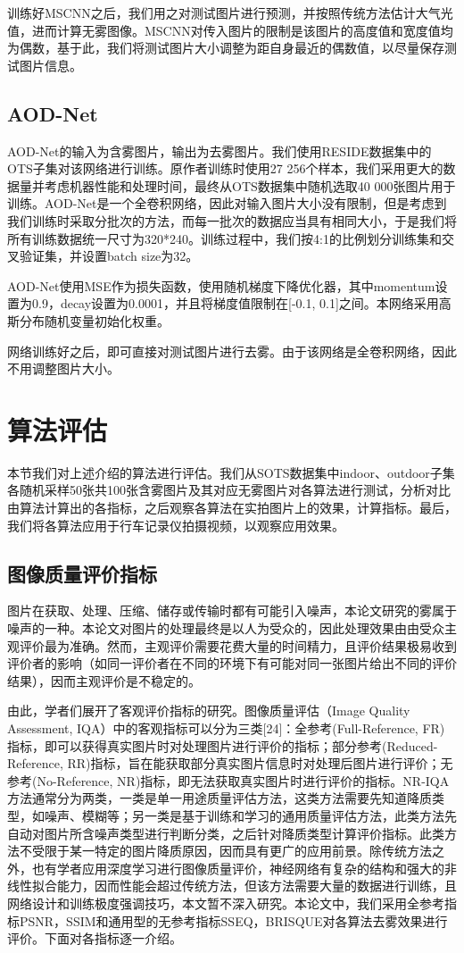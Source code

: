 \documentclass[a4paper, 12pt]{report}
\begin{document}
训练好MSCNN之后，我们用之对测试图片进行预测，并按照传统方法估计大气光值，进而计算无雾图像。MSCNN对传入图片的限制是该图片的高度值和宽度值均为偶数，基于此，我们将测试图片大小调整为距自身最近的偶数值，以尽量保存测试图片信息。

\subsection{AOD-Net\quad}
AOD-Net的输入为含雾图片，输出为去雾图片。我们使用RESIDE数据集中的OTS子集对该网络进行训练。原作者训练时使用27 256个样本，我们采用更大的数据量并考虑机器性能和处理时间，最终从OTS数据集中随机选取40 000张图片用于训练。AOD-Net是一个全卷积网络，因此对输入图片大小没有限制，但是考虑到我们训练时采取分批次的方法，而每一批次的数据应当具有相同大小，于是我们将所有训练数据统一尺寸为320*240。训练过程中，我们按4:1的比例划分训练集和交叉验证集，并设置batch size为32。
	
AOD-Net使用MSE作为损失函数，使用随机梯度下降优化器，其中momentum设置为0.9，decay设置为0.0001，并且将梯度值限制在[-0.1, 0.1]之间。本网络采用高斯分布随机变量初始化权重。
	
网络训练好之后，即可直接对测试图片进行去雾。由于该网络是全卷积网络，因此不用调整图片大小。

\section{算法评估\quad}
本节我们对上述介绍的算法进行评估。我们从SOTS数据集中indoor、outdoor子集各随机采样50张共100张含雾图片及其对应无雾图片对各算法进行测试，分析对比由算法计算出的各指标，之后观察各算法在实拍图片上的效果，计算指标。最后，我们将各算法应用于行车记录仪拍摄视频，以观察应用效果。

\subsection{图像质量评价指标\quad}
图片在获取、处理、压缩、储存或传输时都有可能引入噪声，本论文研究的雾属于噪声的一种。本论文对图片的处理最终是以人为受众的，因此处理效果由由受众主观评价最为准确。然而，主观评价需要花费大量的时间精力，且评价结果极易收到评价者的影响（如同一评价者在不同的环境下有可能对同一张图片给出不同的评价结果），因而主观评价是不稳定的。

由此，学者们展开了客观评价指标的研究。图像质量评估（Image Quality Assessment, IQA）中的客观指标可以分为三类[24]：全参考(Full-Reference, FR)指标，即可以获得真实图片时对处理图片进行评价的指标；部分参考(Reduced-Reference, RR)指标，旨在能获取部分真实图片信息时对处理后图片进行评价；无参考(No-Reference, NR)指标，即无法获取真实图片时进行评价的指标。NR-IQA方法通常分为两类，一类是单一用途质量评估方法，这类方法需要先知道降质类型，如噪声、模糊等；另一类是基于训练和学习的通用质量评估方法，此类方法先自动对图片所含噪声类型进行判断分类，之后针对降质类型计算评价指标。此类方法不受限于某一特定的图片降质原因，因而具有更广的应用前景。除传统方法之外，也有学者应用深度学习进行图像质量评价，神经网络有复杂的结构和强大的非线性拟合能力，因而性能会超过传统方法，但该方法需要大量的数据进行训练，且网络设计和训练极度强调技巧，本文暂不深入研究。本论文中，我们采用全参考指标PSNR，SSIM和通用型的无参考指标SSEQ，BRISQUE对各算法去雾效果进行评价。下面对各指标逐一介绍。
\end{document}
